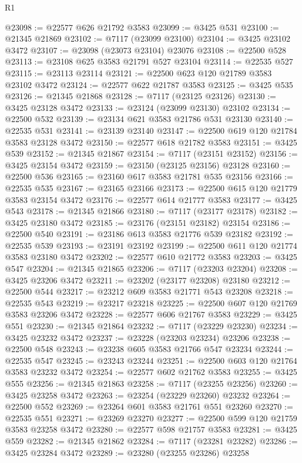 \begin{lexlean}{R1}
\begin{coremodule}
@23098 := @22577 @626 @21792 @3583
@23099 := @3425 @531
@23100 := @21345 @21869
@23102 := @7117 (@23099 @23100)
@23104 := @3425 @23102 @3472
@23107 := @23098 (@23073 @23104) @23076
@23108 := @22500 @528
@23113 := @23108 @625 @3583 @21791 @527 @23104
@23114 := @22535 @527
@23115 := @23113 @23114
@23121 := @22500 @623 @120 @21789 @3583 @23102 @3472
@23124 := @22577 @622 @21787 @3583
@23125 := @3425 @535
@23126 := @21345 @21868
@23128 := @7117 (@23125 @23126)
@23130 := @3425 @23128 @3472
@23133 := @23124 (@23099 @23130) @23102
@23134 := @22500 @532
@23139 := @23134 @621 @3583 @21786 @531 @23130
@23140 := @22535 @531
@23141 := @23139 @23140
@23147 := @22500 @619 @120 @21784 @3583 @23128 @3472
@23150 := @22577 @618 @21782 @3583
@23151 := @3425 @539
@23152 := @21345 @21867
@23154 := @7117 (@23151 @23152)
@23156 := @3425 @23154 @3472
@23159 := @23150 (@23125 @23156) @23128
@23160 := @22500 @536
@23165 := @23160 @617 @3583 @21781 @535 @23156
@23166 := @22535 @535
@23167 := @23165 @23166
@23173 := @22500 @615 @120 @21779 @3583 @23154 @3472
@23176 := @22577 @614 @21777 @3583
@23177 := @3425 @543
@23178 := @21345 @21866
@23180 := @7117 (@23177 @23178)
@23182 := @3425 @23180 @3472
@23185 := @23176 (@23151 @23182) @23154
@23186 := @22500 @540
@23191 := @23186 @613 @3583 @21776 @539 @23182
@23192 := @22535 @539
@23193 := @23191 @23192
@23199 := @22500 @611 @120 @21774 @3583 @23180 @3472
@23202 := @22577 @610 @21772 @3583
@23203 := @3425 @547
@23204 := @21345 @21865
@23206 := @7117 (@23203 @23204)
@23208 := @3425 @23206 @3472
@23211 := @23202 (@23177 @23208) @23180
@23212 := @22500 @544
@23217 := @23212 @609 @3583 @21771 @543 @23208
@23218 := @22535 @543
@23219 := @23217 @23218
@23225 := @22500 @607 @120 @21769 @3583 @23206 @3472
@23228 := @22577 @606 @21767 @3583
@23229 := @3425 @551
@23230 := @21345 @21864
@23232 := @7117 (@23229 @23230)
@23234 := @3425 @23232 @3472
@23237 := @23228 (@23203 @23234) @23206
@23238 := @22500 @548
@23243 := @23238 @605 @3583 @21766 @547 @23234
@23244 := @22535 @547
@23245 := @23243 @23244
@23251 := @22500 @603 @120 @21764 @3583 @23232 @3472
@23254 := @22577 @602 @21762 @3583
@23255 := @3425 @555
@23256 := @21345 @21863
@23258 := @7117 (@23255 @23256)
@23260 := @3425 @23258 @3472
@23263 := @23254 (@23229 @23260) @23232
@23264 := @22500 @552
@23269 := @23264 @601 @3583 @21761 @551 @23260
@23270 := @22535 @551
@23271 := @23269 @23270
@23277 := @22500 @599 @120 @21759 @3583 @23258 @3472
@23280 := @22577 @598 @21757 @3583
@23281 := @3425 @559
@23282 := @21345 @21862
@23284 := @7117 (@23281 @23282)
@23286 := @3425 @23284 @3472
@23289 := @23280 (@23255 @23286) @23258

\end{coremodule}
\end{lexlean}
